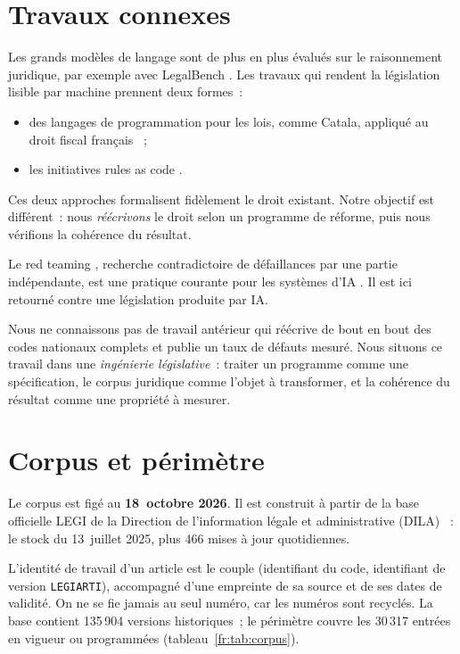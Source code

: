 \documentclass[11pt,a4paper]{article}
\begin{document}
\section{Travaux connexes}

Les grands modèles de langage sont de plus en plus évalués sur le raisonnement juridique, par exemple avec LegalBench \cite{fr:legalbench}. Les travaux qui rendent la législation lisible par machine prennent deux formes~:
\begin{itemize}
  \item des langages de programmation pour les lois, comme Catala, appliqué au droit fiscal français \cite{fr:catala}~;
  \item les initiatives \og rules as code \fg{} \cite{fr:oecd2020}.
\end{itemize}
Ces deux approches formalisent fidèlement le droit existant. Notre objectif est différent~: nous \emph{réécrivons} le droit selon un programme de réforme, puis nous vérifions la cohérence du résultat.

Le \og red teaming \fg{}, recherche contradictoire de défaillances par une partie indépendante, est une pratique courante pour les systèmes d'IA \cite{fr:ganguli2022}. Il est ici retourné contre une législation produite par IA.

Nous ne connaissons pas de travail antérieur qui réécrive de bout en bout des codes nationaux complets et publie un taux de défauts mesuré. Nous situons ce travail dans une \emph{ingénierie législative}~: traiter un programme comme une spécification, le corpus juridique comme l'objet à transformer, et la cohérence du résultat comme une propriété à mesurer.

\section{Corpus et périmètre}
\label{fr:sec:corpus}

Le corpus est figé au \textbf{18~octobre 2026}. Il est construit à partir de la base officielle LEGI de la Direction de l'information légale et administrative (DILA) \cite{fr:legi}~: le stock du 13~juillet 2025, plus 466 mises à jour quotidiennes.

L'identité de travail d'un article est le couple (identifiant du code, identifiant de version \texttt{LEGIARTI}), accompagné d'une empreinte de sa source et de ses dates de validité. On ne se fie jamais au seul numéro, car les numéros sont recyclés. La base contient 135\,904 versions historiques~; le périmètre couvre les 30\,317 entrées en vigueur ou programmées (tableau~\ref{fr:tab:corpus}).
\end{document}
